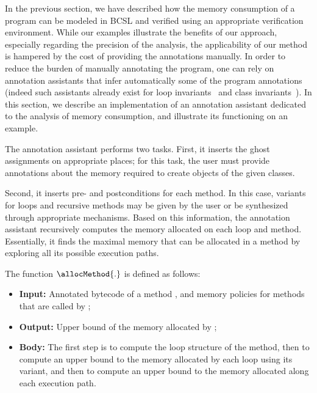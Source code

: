In the previous section, we have described how the memory consumption
of a program can be modeled in BCSL and verified using an appropriate
verification environment. While our examples illustrate the benefits
of our approach, especially regarding the precision of the analysis,
the applicability of our method is hampered by the cost of providing
the annotations manually. In order to reduce the burden of manually
annotating the program, one can rely on annotation assistants that
infer automatically some of the program annotations (indeed such
assistants already exist for loop invariants~\cite{NimmerE02:ISSTA} and class
invariants~\cite{log04:vmcai}). In this section, we describe an
implementation of an annotation assistant dedicated to the analysis of
memory consumption, and illustrate its functioning on an example.
 
The annotation assistant performs two tasks. First, it inserts the
ghost assignments on appropriate places; for this task, the user must
provide annotations about the memory required to create objects of the
given classes. 

Second, it inserts pre- and postconditions for each method. In this case, variants for loops and recursive methods may be given by the user or be
synthesized through appropriate mechanisms.  Based on this
information, the annotation assistant recursively computes the memory
allocated on each loop and method. Essentially, it finds the maximal
memory that can be allocated in a method by exploring all its possible
execution paths.

The function $\allocMethod{.}$ is defined as follows:
\begin{itemize}
\item \textbf{Input:} Annotated bytecode of a method \method, and memory
policies for methods that are called by \method;

\item \textbf{Output:} Upper bound of the memory allocated by \method;

\item \textbf{Body:} The first step is to compute the loop structure
of the method, then to compute an upper bound to the memory allocated
by each loop using its variant, and then to compute an upper bound to
the memory allocated along each execution path.
\end{itemize}




